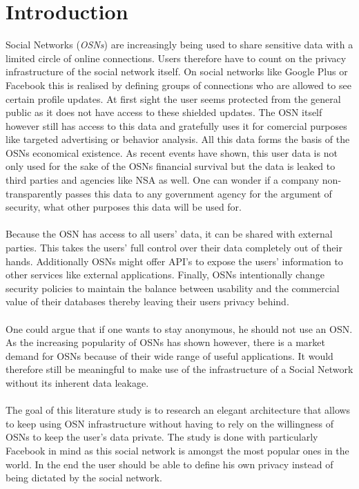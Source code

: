 \documentclass[journal]{IEEEtran}
\begin{document}
\section{Introduction}
 Social Networks (\textit{OSNs}) are increasingly being
used to share sensitive data with a limited circle of online connections. Users
therefore have to count on the privacy infrastructure of the social network
itself. On social networks like Google Plus or Facebook this is realised by
defining groups of connections who are allowed to see certain profile updates.
At first sight the user seems protected from the general public as it does not
have access to these shielded updates. The OSN itself however still has access
to this data and gratefully uses it for comercial purposes like targeted
advertising or behavior analysis. All this data forms the basis of the OSNs
economical existence. As recent events have shown, this user data is not
only used for the sake of the OSNs financial survival but the data is
 leaked to third parties and agencies like NSA as well. One can wonder if a
company non-transparently passes this data to any government agency for the
argument of security, what other purposes this data will be used for.\\
\\
Because the OSN has access to all users' data, it can be shared with external
parties. This takes the users' full control over their data completely out of
their hands. Additionally OSNs might offer API's to expose the users'
information to other services like external applications. Finally, OSNs
intentionally change security policies to maintain the balance between
usability and the commercial value of their databases thereby leaving their
users privacy behind.~\cite{BeatoScramble}\\
\\
One could argue that if one wants to stay anonymous, he should not use an OSN.
As the increasing popularity of OSNs has shown however, there is a market
demand for OSNs because of their wide range of useful applications. It would
therefore still be meaningful to make use of the infrastructure of a Social
Network without its inherent data leakage.\\
\\
The goal of this literature study is to research an elegant architecture that
allows to keep using OSN infrastructure without having to rely on the
willingness of OSNs to keep the user's data private. The study is done with
particularly Facebook in mind as this social network is amongst the most
popular ones in the world. In the end the user should be able to define his
own privacy instead of being dictated by the social network.
\end{document}
